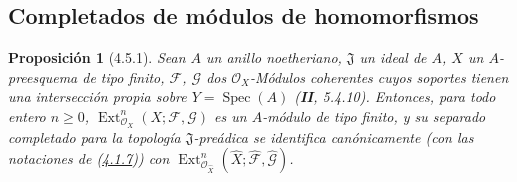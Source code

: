 \documentclass[10pt,oneside,openany]{book}
\theoremstyle{egaenv}\newtheorem*{env}{---}
\theoremstyle{egastatement}
\newtheorem*{proposition}{Proposición}
\theoremstyle{egadescription}
\renewcommand{\geq}{\geqslant}
\begin{document}
\subsection{Completados de módulos de homomorfismos}
\label{subsection:III.4.5-fr}

\begin{proposition}[4.5.1]
\label{III.4.5.1-fr}
Sean $A$ un anillo noetheriano, $\mathfrak J$ un ideal de $A$, $X$ un
$A$-preesquema de tipo finito, $\mathcal F$, $\mathcal G$ dos
$\mathcal O_X$-Módulos coherentes cuyos soportes tienen una intersección
propia sobre $Y=\operatorname{Spec}(A)$ \textup{(\textbf{II}, 5.4.10)}. Entonces, para todo entero
$n\geq0$, $\operatorname{Ext}^n_{\mathcal O_X}(X;\mathcal F,\mathcal G)$ es un $A$-módulo
de tipo finito, y su separado completado para la topología $\mathfrak J$-preádica
se identifica canónicamente (con las notaciones de
\textup{(\hyperref[III.4.1.7-fr]{4.1.7})}) con
$\operatorname{Ext}^n_{\mathcal O_{\widehat X}}(\widehat X;\widehat{\mathcal F},
\widehat{\mathcal G})$.
\end{proposition}
\end{document}
